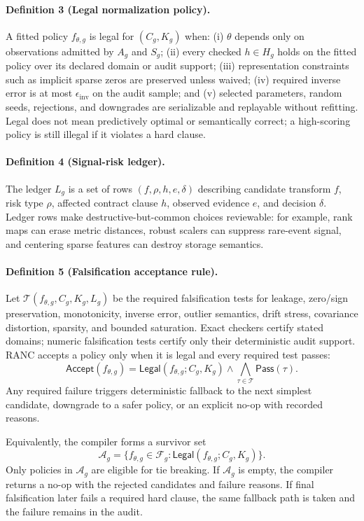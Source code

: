 \documentclass{article}
\begin{document}
\paragraph{Definition 3 (Legal normalization policy).}
A fitted policy $f_{\theta,g}$ is legal for $(C_g,K_g)$ when: (i) $\theta$
depends only on observations admitted by $A_g$ and $S_g$; (ii) every checked
$h\in H_g$ holds on the fitted policy over its declared domain or audit support;
(iii) representation constraints such as implicit sparse zeros are preserved
unless waived; (iv) required inverse error is at most
$\epsilon_{\mathrm{inv}}$ on the audit sample; and (v) selected parameters,
random seeds, rejections, and downgrades are serializable and replayable without
refitting. Legal does not mean predictively optimal or semantically correct; a
high-scoring policy is still illegal if it violates a hard clause.

\paragraph{Definition 4 (Signal-risk ledger).}
The ledger $L_g$ is a set of rows
$(f,\rho,h,e,\delta)$ describing candidate transform $f$, risk type $\rho$,
affected contract clause $h$, observed evidence $e$, and decision $\delta$.
Ledger rows make destructive-but-common choices reviewable: for example, rank
maps can erase metric distances, robust scalers can suppress rare-event signal,
and centering sparse features can destroy storage semantics.

\paragraph{Definition 5 (Falsification acceptance rule).}
Let $\mathcal{T}(f_{\theta,g},C_g,K_g,L_g)$ be the required falsification tests
for leakage, zero/sign preservation, monotonicity, inverse error, outlier
semantics, drift stress, covariance distortion, sparsity, and bounded
saturation. Exact checkers certify stated domains; numeric falsification tests
certify only their deterministic audit support. RANC accepts a policy only when
it is legal and every required test passes:
\[
\mathsf{Accept}(f_{\theta,g}) =
\mathsf{Legal}(f_{\theta,g}; C_g,K_g)
\wedge
\bigwedge_{\tau \in \mathcal{T}}\mathsf{Pass}(\tau).
\]
Any required failure triggers deterministic fallback to the next simplest
candidate, downgrade to a safer policy, or an explicit no-op with recorded
reasons.

Equivalently, the compiler forms a survivor set
\[
\mathcal{A}_g =
\{f_{\theta,g}\in\mathcal{F}_g:
\mathsf{Legal}(f_{\theta,g}; C_g,K_g)\}.
\]
Only policies in $\mathcal{A}_g$ are eligible for tie breaking. If
$\mathcal{A}_g$ is empty, the compiler returns a no-op with the rejected
candidates and failure reasons. If final falsification later fails a required
hard clause, the same fallback path is taken and the failure remains in the
audit.
\end{document}
